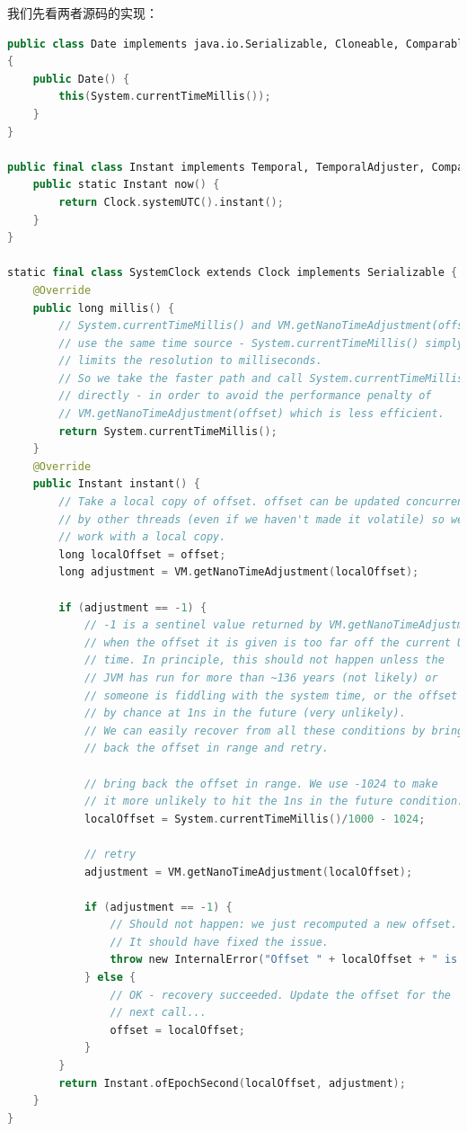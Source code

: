 \documentclass[cn,10pt,math=newtx,citestyle=gb7714-2015,bibstyle=gb7714-2015]{elegantbook}
\begin{document}
    我们先看两者源码的实现：

    \begin{lstlisting}[language=Kotlin]
public class Date implements java.io.Serializable, Cloneable, Comparable<Date>
{
    public Date() {
        this(System.currentTimeMillis());
    }
}

public final class Instant implements Temporal, TemporalAdjuster, Comparable<Instant>, Serializable {
    public static Instant now() {
        return Clock.systemUTC().instant();
    }
}

static final class SystemClock extends Clock implements Serializable {
    @Override
    public long millis() {
        // System.currentTimeMillis() and VM.getNanoTimeAdjustment(offset)
        // use the same time source - System.currentTimeMillis() simply
        // limits the resolution to milliseconds.
        // So we take the faster path and call System.currentTimeMillis()
        // directly - in order to avoid the performance penalty of
        // VM.getNanoTimeAdjustment(offset) which is less efficient.
        return System.currentTimeMillis();
    }
    @Override
    public Instant instant() {
        // Take a local copy of offset. offset can be updated concurrently
        // by other threads (even if we haven't made it volatile) so we will
        // work with a local copy.
        long localOffset = offset;
        long adjustment = VM.getNanoTimeAdjustment(localOffset);

        if (adjustment == -1) {
            // -1 is a sentinel value returned by VM.getNanoTimeAdjustment
            // when the offset it is given is too far off the current UTC
            // time. In principle, this should not happen unless the
            // JVM has run for more than ~136 years (not likely) or
            // someone is fiddling with the system time, or the offset is
            // by chance at 1ns in the future (very unlikely).
            // We can easily recover from all these conditions by bringing
            // back the offset in range and retry.

            // bring back the offset in range. We use -1024 to make
            // it more unlikely to hit the 1ns in the future condition.
            localOffset = System.currentTimeMillis()/1000 - 1024;

            // retry
            adjustment = VM.getNanoTimeAdjustment(localOffset);

            if (adjustment == -1) {
                // Should not happen: we just recomputed a new offset.
                // It should have fixed the issue.
                throw new InternalError("Offset " + localOffset + " is not in range");
            } else {
                // OK - recovery succeeded. Update the offset for the
                // next call...
                offset = localOffset;
            }
        }
        return Instant.ofEpochSecond(localOffset, adjustment);
    }
}
    \end{lstlisting}
\end{document}
